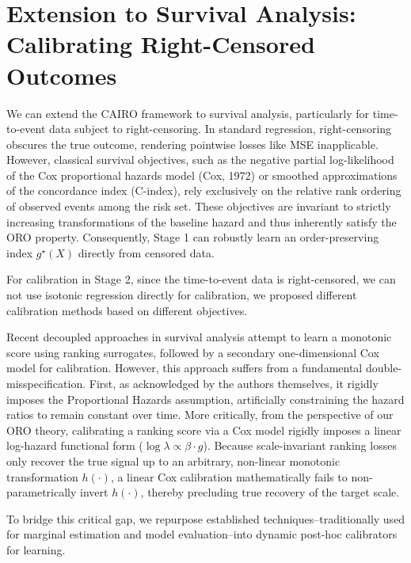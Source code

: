 \documentclass[11pt]{article}
\theoremstyle{plain}
\theoremstyle{plain}
\theoremstyle{plain}
\theoremstyle{plain}
\theoremstyle{plain}
\theoremstyle{plain}
\theoremstyle{plain}
\begin{document}
\section{Extension to Survival Analysis: Calibrating Right-Censored Outcomes}
\label{sec:survival_extension}

{\color{blue} We can extend the \textsc{CAIRO} framework to survival analysis, particularly for time-to-event data subject to right-censoring.  
In standard regression, right-censoring obscures the true outcome, rendering pointwise losses like MSE
inapplicable. However, classical survival objectives, such as the negative partial log-likelihood of the Cox
proportional hazards model (Cox, 1972) or smoothed approximations of the concordance index (C-index),
rely exclusively on the relative rank ordering of observed events among the risk set. These objectives are
invariant to strictly increasing transformations of the baseline hazard and thus inherently satisfy the ORO property. Consequently, Stage 1 can robustly learn an order-preserving index $g^{\star}(X)$
directly from censored data.


For calibration in Stage 2, since the time-to-event data is right-censored, we can not use isotonic regression directly for calibration, we proposed different calibration methods based on different objectives.


Recent decoupled approaches in survival analysis \cite{ashhad2026graft} attempt to learn a monotonic score using ranking surrogates, followed by a secondary one-dimensional Cox model for calibration. 
However, this approach suffers from a fundamental double-misspecification. First, as acknowledged by the authors themselves, it rigidly imposes the Proportional Hazards assumption, artificially constraining the hazard ratios to remain constant over time. More critically, from the perspective of our ORO theory, calibrating a ranking score via a Cox model rigidly imposes a linear log-hazard functional form ($\log \lambda \propto \beta \cdot g$). Because scale-invariant ranking losses only recover the true signal up to an arbitrary, non-linear monotonic transformation $h(\cdot)$, a linear Cox calibration mathematically fails to non-parametrically invert $h(\cdot)$, thereby precluding true recovery of the target scale.  

To bridge this critical gap, we   repurpose established techniques--traditionally used for marginal estimation and model evaluation--into dynamic post-hoc calibrators for learning.

}
\end{document}
